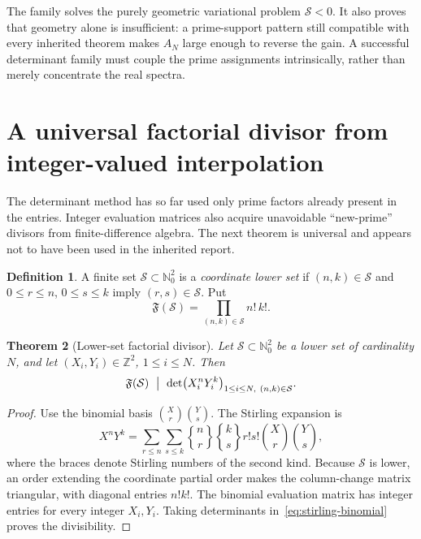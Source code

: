 \documentclass[11pt]{article}
\newcommand{\Nzero}{\mathbb N_0}
\newcommand{\Z}{\mathbb Z}
\newcommand{\1}{\mathbf 1}
\theoremstyle{plain}
\newtheorem{theorem}{Theorem}[section]
\theoremstyle{definition}
\newtheorem{definition}[theorem]{Definition}
\theoremstyle{remark}
\begin{document}
\begin{warningbox}
The family solves the purely geometric variational problem
$\mathscr S<0$.  It also proves that geometry alone is insufficient: a
prime-support pattern still compatible with every inherited theorem makes
$A_N$ large enough to reverse the gain.  A successful determinant family
must couple the prime assignments intrinsically, rather than merely
concentrate the real spectra.
\end{warningbox}

\section{A universal factorial divisor from integer-valued interpolation}
\label{sec:factorial}

The determinant method has so far used only prime factors already present in
the entries.  Integer evaluation matrices also acquire unavoidable
``new-prime'' divisors from finite-difference algebra.  The next theorem is
universal and appears not to have been used in the inherited report.

\begin{definition}
A finite set $\mathcal S\subset\Nzero^2$ is a \emph{coordinate lower set} if
$(n,k)\in\mathcal S$ and $0\le r\le n$, $0\le s\le k$ imply
$(r,s)\in\mathcal S$.  Put
\begin{equation}\label{eq:factorial-product}
 \mathfrak F(\mathcal S)=\prod_{(n,k)\in\mathcal S}n!\,k!.
\end{equation}
\end{definition}

\begin{theorem}[Lower-set factorial divisor]\label{thm:factorial-divisor}
Let $\mathcal S\subset\Nzero^2$ be a lower set of cardinality $N$, and let
$(X_i,Y_i)\in\Z^2$, $1\le i\le N$.  Then
\begin{equation}\label{eq:factorial-divisibility}
 \mathfrak F(\mathcal S)
 \ \bigm|\ 
 \det\bigl(X_i^nY_i^k\bigr)_{1\le i\le N,\ (n,k)\in\mathcal S}.
\end{equation}
\end{theorem}

\begin{proof}
Use the binomial basis
$\binom Xr\binom Ys$.  The Stirling expansion is
\begin{equation}\label{eq:stirling-binomial}
 X^nY^k
 =\sum_{r\le n}\sum_{s\le k}
 \genfrac\{\}{0pt}{}{n}{r}
 \genfrac\{\}{0pt}{}{k}{s}
 r!s!\binom Xr\binom Ys,
\end{equation}
where the braces denote Stirling numbers of the second kind.  Because
$\mathcal S$ is lower, an order extending the coordinate partial order makes
the column-change matrix triangular, with diagonal entries $n!k!$.  The
binomial evaluation matrix has integer entries for every integer $X_i,Y_i$.
Taking determinants in~\eqref{eq:stirling-binomial} proves the divisibility.
\end{proof}
\end{document}
